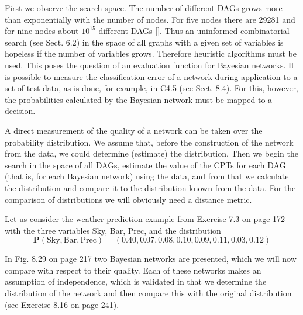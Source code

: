 \documentclass[10pt]{book}
\begin{document}
First we observe the search space. The number of different DAGs grows more than exponentially with the number of nodes. For five nodes there are 29281 and for nine nodes about $10^{15}$ different DAGs [\cite{melancon2000dags}]. Thus an uninformed combinatorial search (see Sect. 6.2) in the space of all graphs with a given set of variables is hopeless if the number of variables grows. Therefore heuristic algorithms must be used. This poses the question of an evaluation function for Bayesian networks. It is possible to measure the classification error of a network during application to a set of test data, as is done, for example, in C4.5 (see Sect. 8.4). For this, however, the probabilities calculated by the Bayesian network must be mapped to a decision.

A direct measurement of the quality of a network can be taken over the probability distribution. We assume that, before the construction of the network from the data, we could determine (estimate) the distribution. Then we begin the search in the space of all DAGs, estimate the value of the CPTs for each DAG (that is, for each Bayesian network) using the data, and from that we calculate the distribution and compare it to the distribution known from the data. For the comparison of distributions we will obviously need a distance metric.

Let us consider the weather prediction example from Exercise 7.3 on page 172 with the three variables Sky, Bar, Prec, and the distribution
$$
\boldsymbol{P}(\text{Sky}, \text{Bar}, \text{Prec})=(0.40,0.07,0.08,0.10,0.09,0.11,0.03,0.12)
$$

In Fig. 8.29 on page 217 two Bayesian networks are presented, which we will now compare with respect to their quality. Each of these networks makes an assumption of independence, which is validated in that we determine the distribution of the network and then compare this with the original distribution (see Exercise 8.16 on page 241).
\end{document}
